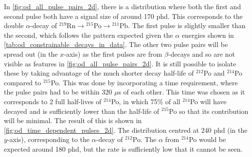 

\par
In \autoref{fig:od_all_pulse_pairs_2d}, there is a distribution where both the first and second pulse both have a signal size of around 170 phd.
This corresponds to the double $\alpha$-decay of ${}^{219}$Rn$\to{}^{215}$Po$\to{}^{211}$Pb.
The first pulse is slightly smaller than the second, which follows the pattern expected given the $\alpha$ energies shown in \autoref{tab:od_constrainable_decays_in_data}.
The other two pulse pairs will be spread out (in the $x$-axis) as the first pulses are from $\beta$-decays and so are not visible as features in \autoref{fig:od_all_pulse_pairs_2d}.
It is still possible to isolate these by taking advantage of the much shorter decay half-life of ${}^{212}$Po and ${}^{214}$Po compared to ${}^{215}$Po.
This was done by incorporating a time requirement, where the pulse pairs had to be within 320 $\mu$s of each other.
This time was chosen as it corresponds to 2 full half-lives of ${}^{214}$Po, in which 75\% of all ${}^{214}$Po will have decayed and is sufficiently lower than the half-life of ${}^{215}$Po so that its contribution will be minimal.
The result of this is shown in \autoref{fig:od_time_dependent_pulses_2d}.
The distribution centred at 240 phd (in the $y$-axis), corresponding to the $\alpha$-decay of ${}^{212}$Po.
The $\alpha$ from ${}^{214}$Po would be expected around 180 phd, but the rate is sufficiently low that it cannot be seen.

